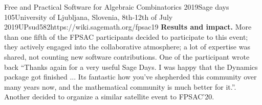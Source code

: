 \begin{event}{Free and Practical Software for Algebraic Combinatorics 2019}{Sage days 105}{University of Ljubljana, Slovenia,
8th-12th of July 2019}{UPsud}{58}{2}{https://wiki.sagemath.org/fpsac19}
\textbf{Results and impact.} More than one fifth of the FPSAC
participants decided to participate to this event; they actively
engaged into the collaborative atmosphere; a lot of expertise was
shared, not counting new software contributions. One of the
participant wrote back ``Thanks again for a very useful Sage Days. I
was happy that the Dynamics package got finished ... Its fantastic how
you’ve shepherded this community over many years now, and the
mathematical community is much better for it.''. Another decided to
organize a similar satellite event to FPSAC'20.

\end{event}
